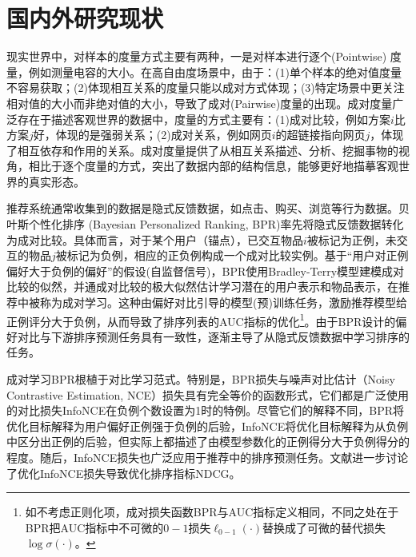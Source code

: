 \section{国内外研究现状}
\label{sec:requirement}
现实世界中，对样本的度量方式主要有两种，一是对样本进行逐个(Pointwise) 度量，例如测量电容的大小。在高自由度场景中，由于：(1)单个样本的绝对值度量不容易获取；(2)体现相互关系的度量只能以成对方式体现；(3)特定场景中更关注相对值的大小而非绝对值的大小，导致了成对(Pairwise)度量的出现。成对度量广泛存在于描述客观世界的数据中，度量的方式主要有：(1)成对比较，例如方案$i$比方案$j$好，体现的是强弱关系；(2)成对关系，例如网页$i$的超链接指向网页$j$，体现了相互依存和作用的关系。成对度量提供了从相互关系描述、分析、挖掘事物的视角，相比于逐个度量的方式，突出了数据内部的结构信息，能够更好地描摹客观世界的真实形态。

\vspace{-0.0011cm}
推荐系统通常收集到的数据是隐式反馈数据，如点击、购买、浏览等行为数据。贝叶斯个性化排序 (Bayesian Personalized Ranking, BPR)\cite{Steffen:2009:UAI}率先将隐式反馈数据转化为成对比较。具体而言，对于某个用户（锚点），已交互物品$i$被标记为正例，未交互的物品$j$被标记为负例，相应的正负例构成一个成对比较实例。基于“用户对正例偏好大于负例的偏好”的假设(自监督信号)，BPR使用Bradley-Terry模型\cite{Bradley:1952:Biometrika,Luce:2005:JASA}建模成对比较的似然，并通成对比较的极大似然估计学习潜在的用户表示和物品表示，在推荐中被称为成对学习\cite{Steffen:2009:UAI,Steffen:2014:WSDM,Xiangnan:2020:SIGIR,Wang:2019:SIGIR}。这种由偏好对比引导的模型(预)训练任务，激励推荐模型给正例评分大于负例，从而导致了排序列表的AUC指标的优化\footnote{如不考虑正则化项，成对损失函数BPR与AUC指标定义相同，不同之处在于BPR把AUC指标中不可微的$0-1$损失$\ell_{0-1}(\cdot)$替换成了可微的替代损失$\log\sigma(\cdot)$\cite{Steffen:2009:UAI}。}。由于BPR设计的偏好对比与下游排序预测任务具有一致性，逐渐主导了从隐式反馈数据中学习排序的任务\cite{Weike:2013:IJCAI,Yu:2018:CIKM,Xiaoye:2011:MathProg,Xuejiao:2020:ASC,Qiu:2018:IS,Zhao:2019:FGCS}。

\vspace{-0.0011cm}
成对学习BPR根植于对比学习范式\cite{Xu:2022:arxiv}。特别是，BPR损失与噪声对比估计\cite{Gutmann:2010:ICAIS,gutmann:2012:JMLR}（Noisy Contrastive Estimation, NCE）损失具有完全等价的函数形式\cite{Liu:2021:TKDE}，它们都是广泛使用的对比损失InfoNCE\cite{Oord:2018:arxiv}在负例个数设置为1时的特例。尽管它们的解释不同，BPR将优化目标解释为用户偏好正例强于负例的后验，InfoNCE将优化目标解释为从负例中区分出正例的后验，但实际上都描述了由模型参数化的正例得分大于负例得分的程度。随后，InfoNCE损失也广泛应用于推荐中的排序预测任务\cite{Jiancan:2022:arxiv,lightgcl:2023:ICLR}。文献\cite{Jiancan:2022:arxiv}进一步讨论了优化InfoNCE损失导致优化排序指标NDCG。

